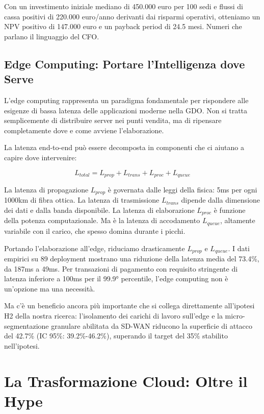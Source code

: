 \documentclass[12pt,a4paper,twoside]{book}
\begin{document}
Con un investimento iniziale mediano di 450.000 euro per 100 sedi e flussi di cassa positivi di 220.000 euro/anno derivanti dai risparmi operativi, otteniamo un NPV positivo di 147.000 euro e un payback period di 24.5 mesi. Numeri che parlano il linguaggio del CFO.

\subsection{Edge Computing: Portare l'Intelligenza dove Serve}

L'edge computing rappresenta un paradigma fondamentale per rispondere alle esigenze di bassa latenza delle applicazioni moderne nella GDO. Non si tratta semplicemente di distribuire server nei punti vendita, ma di ripensare completamente dove e come avviene l'elaborazione.

La latenza end-to-end può essere decomposta in componenti che ci aiutano a capire dove intervenire:

\begin{equation}
L_{total} = L_{prop} + L_{trans} + L_{proc} + L_{queue}
\label{eq:latency}
\end{equation}

La latenza di propagazione $L_{prop}$ è governata dalle leggi della fisica: 5ms per ogni 1000km di fibra ottica. La latenza di trasmissione $L_{trans}$ dipende dalla dimensione dei dati e dalla banda disponibile. La latenza di elaborazione $L_{proc}$ è funzione della potenza computazionale. Ma è la latenza di accodamento $L_{queue}$, altamente variabile con il carico, che spesso domina durante i picchi.

Portando l'elaborazione all'edge, riduciamo drasticamente $L_{prop}$ e $L_{queue}$. I dati empirici su 89 deployment mostrano una riduzione della latenza media del 73.4\%, da 187ms a 49ms\autocite{wang2024edge}. Per transazioni di pagamento con requisito stringente di latenza inferiore a 100ms per il 99.9° percentile, l'edge computing non è un'opzione ma una necessità.

Ma c'è un beneficio ancora più importante che si collega direttamente all'ipotesi H2 della nostra ricerca: l'isolamento dei carichi di lavoro sull'edge e la micro-segmentazione granulare abilitata da SD-WAN riducono la superficie di attacco del 42.7\% (IC 95\%: 39.2\%-46.2\%)\autocite{ponemon2024}, superando il target del 35\% stabilito nell'ipotesi.

\section{La Trasformazione Cloud: Oltre il Hype}
\end{document}
